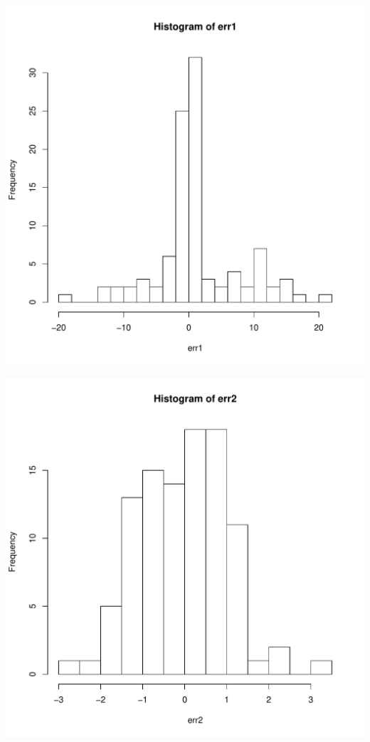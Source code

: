 \documentclass{article}\usepackage[]{graphicx}\usepackage[]{color}
\makeatletter
\def\maxwidth{ %
  \ifdim\Gin@nat@width>\linewidth
    \linewidth
  \else
    \Gin@nat@width
  \fi
}
\newenvironment{knitrout}{}{} %
\makeatother
\begin{document}
\begin{knitrout}
\color{fgcolor}
\includegraphics[width=\maxwidth]{figure/first-1} 

\includegraphics[width=\maxwidth]{figure/first-2} 

\end{knitrout}
\end{document}
